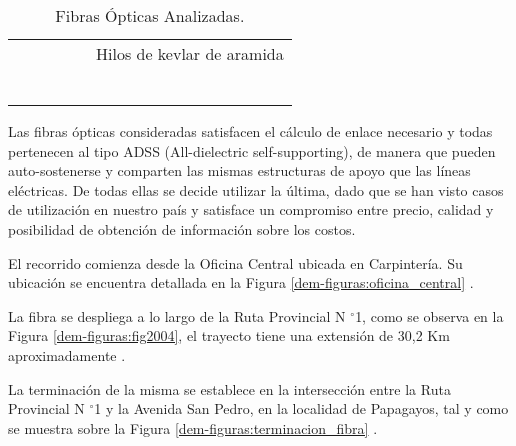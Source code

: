 \begin{table}[H]
\begin{tabular}{|c|c|c|c|c|cc|}
          &       &       &       &       & \multicolumn{2}{c|}{Hilos de kevlar de aramida} \\
          &       &       &       &       & \multicolumn{2}{c|}{} \\
          &       &       &       &       & \multicolumn{2}{c|}{} \\
          &       &       &       &       & \multicolumn{2}{c|}{} \\
          &       &       &       &       & \multicolumn{2}{c|}{} \\
          &       &       &       &       & \multicolumn{2}{c|}{} \\
          &       &       &       &       & \multicolumn{2}{c|}{} \bigstrut[b]\\
    \hline
    \end{tabular}%
  \caption{Fibras Ópticas Analizadas.}
  \label{tab:fo-analizadas}%
\end{table}%


Las fibras ópticas consideradas satisfacen el cálculo de enlace necesario y todas pertenecen al tipo ADSS (All-dielectric self-supporting), de manera que pueden auto-sostenerse y comparten las mismas estructuras de apoyo que las líneas eléctricas. De todas ellas se decide utilizar la última, dado que se han visto casos de utilización en nuestro país y satisface un compromiso entre precio, calidad y posibilidad de obtención de información sobre los costos.


El recorrido comienza desde la Oficina Central ubicada en Carpintería. Su ubicación se encuentra detallada en la Figura \ref{dem-figuras:oficina_central} . 





La fibra se despliega a lo largo de la Ruta Provincial N $^{\circ}$1, como se observa en la Figura \ref{dem-figuras:fig2004}, el trayecto tiene una extensión de 30,2 Km aproximadamente \cite{secretaria}.


La terminación de la misma se establece en la intersección entre la Ruta Provincial N $^{\circ}$1 y la Avenida San Pedro, en la localidad de Papagayos, tal y como se muestra sobre la Figura \ref{dem-figuras:terminacion_fibra} .



